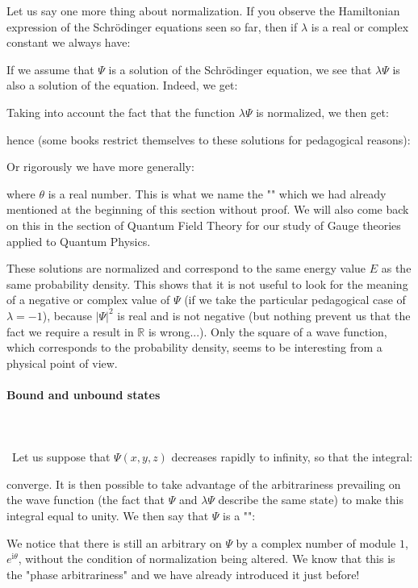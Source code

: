 	Let us say one more thing about normalization. If you observe the Hamiltonian expression of the Schrödinger equations seen so far, then if $\lambda$ is a real or complex constant we always have:
	
	If we assume that $\Psi$ is a solution of the Schrödinger equation, we see that $\lambda\Psi$ is also a solution of the equation. Indeed, we get:
	
	Taking into account the fact that the function $\lambda\Psi$ is normalized, we then get:
	
	hence (some books restrict themselves to these solutions for pedagogical reasons):
	
	Or rigorously we have more generally:
	
	where $\theta$ is a real number. This is what we name the "" which we had already mentioned at the beginning of this section without proof. We will also come back on this in the section of Quantum Field Theory for our study of Gauge theories applied to Quantum Physics.

	These solutions are normalized and correspond to the same energy value $E$ as the same probability density. This shows that it is not useful to look for the meaning of a negative or complex value of $\Psi$ (if we take the particular pedagogical case of $\lambda=-1$), because $|\Psi|^2$ is real and is not negative (but nothing prevent us that the fact we require a result in $\mathbb{R}$ is wrong...). Only the square of a wave function, which corresponds to the probability density, seems to be interesting from a physical point of view.
	
	\paragraph{Bound and unbound states}\mbox{}\\\\\
	Let us suppose that $\Psi(x,y,z)$ decreases rapidly to infinity, so that the integral:
	
	converge. It is then possible to take advantage of the arbitrariness prevailing on the wave function (the fact that $\Psi$ and $\lambda\Psi$ describe the same state) to make this integral equal to unity. We then say that $\Psi$ is a "":
	
	We notice that there is still an arbitrary on $\Psi$ by a complex number of module $1$, $e^{\mathrm{i}\theta}$, without the condition of normalization being altered. We know that this is the "phase arbitrariness" and we have already introduced it just before!
	
